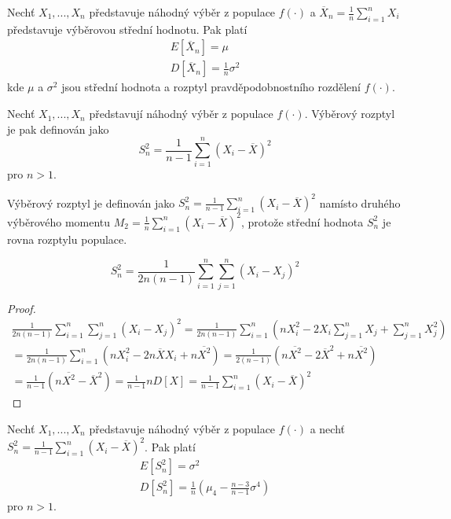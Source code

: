 \begin{corollary}
Nechť $X_1, ..., X_n$ představuje náhodný výběr z populace $f(\cdot)$ a $\overline{X}_n = \frac{1}{n} \sum_{i = 1}^n X_i$ představuje výběrovou střední hodnotu. Pak platí
\begin{gather*}
E[\overline{X}_n] = \mu\\
D[\overline{X}_n] = \frac{1}{n} \sigma^2
\end{gather*}
kde $\mu$ a $\sigma^2$ jsou střední hodnota a rozptyl pravděpodobnostního rozdělení $f(\cdot)$.
\end{corollary}

\begin{definition}
Nechť $X_1, ..., X_n$ představují náhodný výběr z populace $f(\cdot)$. Výběrový rozptyl je pak definován jako
\begin{equation*}
S_n^2 = \frac{1}{n - 1} \sum_{i = 1}^n (X_i - \overline{X})^2
\end{equation*}
pro $n > 1$.
\end{definition}

Výběrový rozptyl je definován jako $S_n^2 = \frac{1}{n - 1} \sum_{i = 1}^n (X_i - \overline{X})^2$ namísto druhého výběrového momentu $M_2 = \frac{1}{n} \sum_{i = 1}^n (X_i - \overline{X})^2$, protože střední hodnota $S_n^2$ je rovna rozptylu populace.

\begin{corollary}
\begin{equation*}
S_n^2 = \frac{1}{2n(n-1)} \sum_{i = 1}^n \sum_{j = 1}^n (X_i - X_j)^2
\end{equation*}
\end{corollary}

\begin{proof}
\begin{gather*}
\frac{1}{2n(n - 1)} \sum_{i = 1}^n \sum_{j = 1}^n (X_i - X_j)^2 = \frac{1}{2n(n - 1)}\sum_{i = 1}^n \left(nX_i^2 - 2 X_i \sum_{j = 1}^n X_j + \sum_{j = 1}^n X_j^2 \right)\\
= \frac{1}{2n(n - 1)} \sum_{i = 1}^n \left(nX_i^2 - 2n \overline{X}X_i + n \overline{X^2} \right) = \frac{1}{2(n-1)}\left(n \overline{X^2} - 2 \overline{X}^2 + n \overline{X^2} \right)\\
= \frac{1}{n - 1}(n\overline{X^2} - \overline{X}^2) = \frac{1}{n - 1}nD[X] = \frac{1}{n - 1}\sum_{i = 1}^n (X_i - \overline{X})^2
\end{gather*}
\end{proof}

\begin{theorem}
Nechť $X_1, ..., X_n$ představuje náhodný výběr z populace $f(\cdot)$ a nechť $S_n^2 = \frac{1}{n - 1} \sum_{i = 1}^n (X_i - \overline{X})^2$. Pak platí
\begin{gather*}
E[S_n^2] = \sigma^2\\
D[S_n^2] = \frac{1}{n}\left(\mu_4 - \frac{n - 3}{n - 1}\sigma^4 \right)
\end{gather*}
pro $n > 1$.
\end{theorem}

